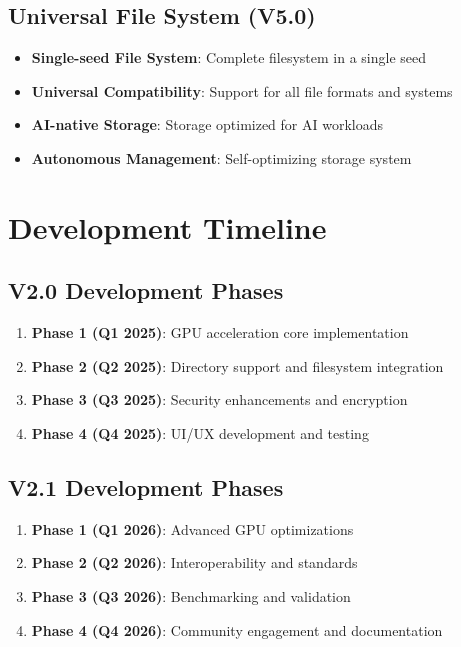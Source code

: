 \documentclass[12pt,a4paper]{article}
\begin{document}
\subsection{Universal File System (V5.0)}
\begin{itemize}
    \item \textbf{Single-seed File System}: Complete filesystem in a single seed
    \item \textbf{Universal Compatibility}: Support for all file formats and systems
    \item \textbf{AI-native Storage}: Storage optimized for AI workloads
    \item \textbf{Autonomous Management}: Self-optimizing storage system
\end{itemize}

\section{Development Timeline}

\subsection{V2.0 Development Phases}
\begin{enumerate}
    \item \textbf{Phase 1 (Q1 2025)}: GPU acceleration core implementation
    \item \textbf{Phase 2 (Q2 2025)}: Directory support and filesystem integration
    \item \textbf{Phase 3 (Q3 2025)}: Security enhancements and encryption
    \item \textbf{Phase 4 (Q4 2025)}: UI/UX development and testing
\end{enumerate}

\subsection{V2.1 Development Phases}
\begin{enumerate}
    \item \textbf{Phase 1 (Q1 2026)}: Advanced GPU optimizations
    \item \textbf{Phase 2 (Q2 2026)}: Interoperability and standards
    \item \textbf{Phase 3 (Q3 2026)}: Benchmarking and validation
    \item \textbf{Phase 4 (Q4 2026)}: Community engagement and documentation
\end{enumerate}
\end{document}
